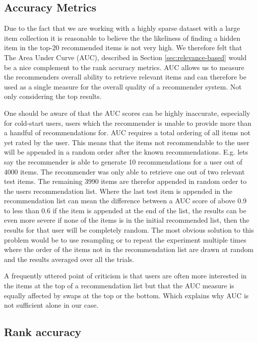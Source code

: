 \subsection{Accuracy Metrics}

Due to the fact that we are working with a highly sparse dataset with a large item collection
it is reasonable to believe the the likeliness of finding a hidden item in the top-20 recommended items
is not very high. We therefore felt that The Area Under Curve (AUC), described in Section \ref{sec:relevance-based}
would be a nice complement to the rank accuracy metrics. AUC allows us to measure the recommenders overall
ability to retrieve relevant items and can therefore be used as a single measure for the overall quality of a recommender
system. Not only considering the top results.

One should be aware of that the AUC scores can be highly inaccurate, especially for cold-start users,
users which the recommender is unable to provide more than a handful of recommendations for. AUC requires
a total ordering of all items not yet rated by the user. This means that the items not recommendable
to the user will be appended in a random order after the known recommendations.
E.g. lets say the recommender is able to generate 10 recommendations for a user out of 4000 items.
The recommender was only able to retrieve one out of two relevant test items. The remaining 3990
items are therefor appended in random order to the users recommendation list. Where the last test item is
appended in the recommendation list can mean the difference between a AUC score of above
0.9 to less than 0.6 if the item is appended at the end of the list, the results can be even more
severe if none of the items is in the initial recommended list, then the results for that user will be
completely random. The most obvious solution to this problem would be to use resampling or to repeat
the experiment multiple times where the order of the items not in the recommendation list are drawn at random and
the results averaged over all the trials.

A frequently uttered point of criticism is that users are often more interested in the items
at the top of a recommendation list but that the AUC measure is equally affected by swaps at the top
or the bottom. Which explains why AUC is not sufficient alone in our case.

\subsection{Rank accuracy}

